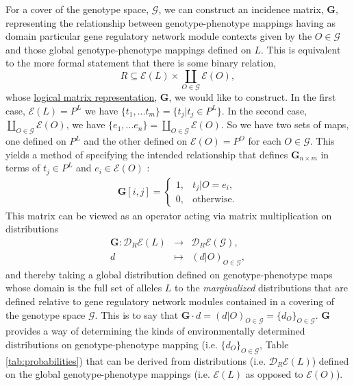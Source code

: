 \documentclass[10pt]{article}
\begin{document}
For a cover of the genotype space, $\mathcal{G}$, we can construct an incidence matrix, $\mathbf{G}$, representing the relationship between genotype-phenotype mappings having as domain particular gene regulatory network module contexts given by the $O \in \mathcal{G}$ and those global genotype-phenotype mappings defined on $L$. This is equivalent to the more formal statement that there is some binary relation,
\begin{equation}
R \subseteq \mathcal{E}(L) \times \coprod_{O \in \mathcal{G}} \mathcal{E}(O),
\end{equation}
whose \href{http://en.wikipedia.org/wiki/Logical_matrix#Matrix_representation_of_a_relation}{logical matrix representation}, $\mathbf{G}$, we would like to construct. In the first case, $\mathcal{E}(L) = P^L$ we have $\{t_1, \ldots t_m\} = \{t_j | t_j \in P^L\}$. In the second case, $\coprod_{O \in \mathcal{G}} \mathcal{E}(O)$, we have $\{e_1, \ldots e_n\} = \coprod_{O \in \mathcal{G}} \mathcal{E}(O)$. So we have two sets of maps, one defined on $P^L$ and the other defined on $\mathcal{E}(O) = P^O$ for each $O \in \mathcal{G}$. This yields a method of specifying the intended relationship that defines $\mathbf{G}_{n \times m}$ in terms of $t_j \in P^L$ and $e_i \in \mathcal{E}(O)$ :
\begin{eqnarray}
\mathbf{G}[i,j] =
\begin{cases}
1, & t_j|O = e_i,\\
0, & \text{otherwise}.
\end{cases}
\end{eqnarray}
This matrix can be viewed as an operator acting via matrix multiplication on distributions
\begin{eqnarray*}
\mathbf{G} \colon \mathcal{D}_R\mathcal{E}(L) &\rightarrow& \mathcal{D}_R\mathcal{E}(\mathcal{G}),\\
d &\mapsto& (d|O)_{O \in \mathcal{G}},
\end{eqnarray*}
and thereby taking a global distribution defined on genotype-phenotype maps whose domain is the full set of alleles $L$ to the \emph{marginalized} distributions that are defined relative to gene regulatory network modules contained in a covering of the genotype space $\mathcal{G}$. This is to say that $\mathbf{G} \cdot d = (d|O)_{O \in \mathcal{G}} = \{d_O\}_{O \in \mathcal{G}}$. $\mathbf{G}$ provides a way of determining the kinds of environmentally determined distributions on genotype-phenotype mapping (i.e. $\{d_O\}_{O \in \mathcal{G}}$, Table \ref{tab:probabilities}) that can be derived from distributions (i.e. $\mathcal{D}_R \mathcal{E}(L)$) defined on the global genotype-phenotype mappings (i.e. $\mathcal{E}(L)$ as opposed to $\mathcal{E}(O)$).
\end{document}
